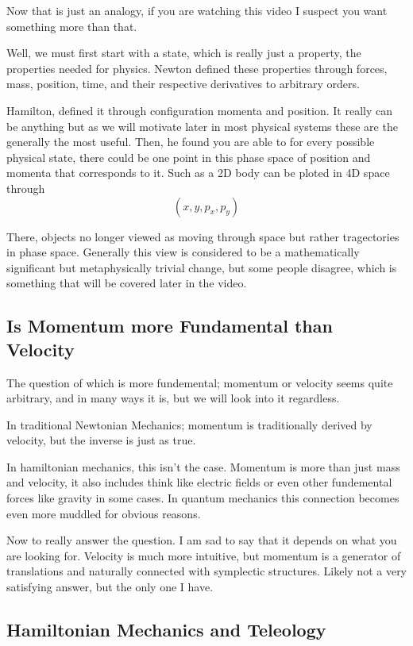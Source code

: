 Now that is just an analogy, if you are watching this video I suspect you want something more than that.

Well, we must first start with a state, which is really just a property, the properties needed for physics. Newton defined these properties through forces, mass, position, time, and their respective derivatives to arbitrary orders.

Hamilton, defined it through configuration momenta and position. It really can be anything but as we will motivate later in most physical systems these are the generally the most useful. Then, he found you are able to for every possible physical state, there could be one point in this phase space of position and momenta that corresponds to it. Such as a 2D body can be ploted in 4D space through
\[
	(x,y,p_x,p_y)
\]

There, objects no longer viewed as moving through space but rather tragectories in phase space. Generally this view is considered to be a mathematically significant but metaphysically trivial change, but some people disagree, which is something that will be covered later in the video.

\subsection{Is Momentum more Fundamental than Velocity}

The question of which is more fundemental; momentum or velocity seems quite arbitrary, and in many ways it is, but we will look into it regardless.

In traditional Newtonian Mechanics; momentum is traditionally derived by velocity, but the inverse is just as true.

In hamiltonian mechanics, this isn't the case. Momentum is more than just mass and velocity, it also includes think like electric fields or even other fundemental forces like gravity in some cases. In quantum mechanics this connection becomes even more muddled for obvious reasons.

Now to really answer the question. I am sad to say that it depends on what you are looking for. Velocity is much more intuitive, but momentum is a generator of translations and naturally connected with symplectic structures. Likely not a very satisfying answer, but the only one I have.


\subsection{Hamiltonian Mechanics and Teleology}


